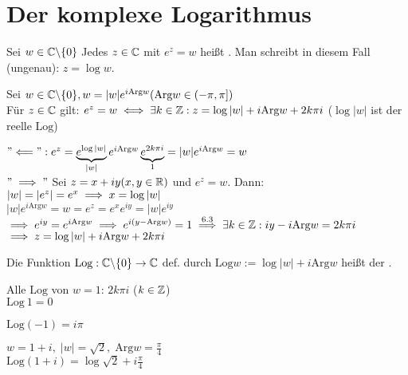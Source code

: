 \documentclass[a4paper,twoside,DIV15,BCOR12mm]{scrbook}
\def\gdw{\equizu}
\def\Arg{\text{Arg}}
\def\Log{\text{Log}}
\def\gdw{\equizu}
\begin{document}
\chapter{Der komplexe Logarithmus}

\begin{definition}
Sei $w \in \mathbb{C} \backslash\{0\}$ Jedes $z \in \mathbb{C}$ mit $e^z = w$ heißt . Man schreibt in diesem Fall (ungenau): $z = \log w$.
\end{definition}

\begin{satz} %
Sei $w \in \MdC\backslash\{0\}, w = |w|e^{i\Arg w} (\Arg w \in (-\pi , \pi])$ \\
Für $z \in \mathbb{C}$ gilt: $e^z = w \gdw \exists k \in \MdZ : z = \log |w| + i\Arg w + 2k\pi i$
($\log |w|$ ist der reelle $\Log$)
\end{satz}

\begin{beweis}
$"\Longleftarrow ": e^z = \underbrace{e^{\log|w|}}_{|w|} e^{i\Arg w}\underbrace{e^{2k\pi i}}_{1} = |w|e^{i\Arg w} = w$ \\
$"\implies "$ Sei $z = x + iy (x,y \in \mathbb{R})$ und $e^z = w$. Dann: $|w| = |e^z| = e^x \implies x = \log|w|$ \\
$|w|e^{i\Arg w} = w = e^z = e^xe^{iy} = |w| e^{iy}$ \\
$\folgt e^{iy} = e^{i\Arg w} \folgt e^{i(y-\Arg w)} = 1 \stackrel{6.3}{\folgt} \exists k \in \MdZ : iy - i\Arg w = 2k\pi i$ \\
$\folgt z = \log |w| + i\Arg w + 2k\pi i$
\end{beweis}

\begin{definition}
Die Funktion $\Log : \MdC \backslash\{0\}\rightarrow \MdC$ def. durch $\Log w := \log |w| + i\Arg w$ heißt der .
\end{definition}

\begin{beispiele}
\item Alle $\Log$ von $w = 1$: $2k\pi i$ ($k \in \mathbb{Z}$) \\
$\Log \ 1 = 0$
\item $\Log (-1) = i\pi$
\item $w = 1+i, \; |w| = \sqrt 2, \; \Arg w = \frac{\pi}{4}$ \\
$\Log (1+i) = \log \sqrt 2 + i\frac{\pi}{4}$
\end{beispiele}

\newpage
\end{document}
